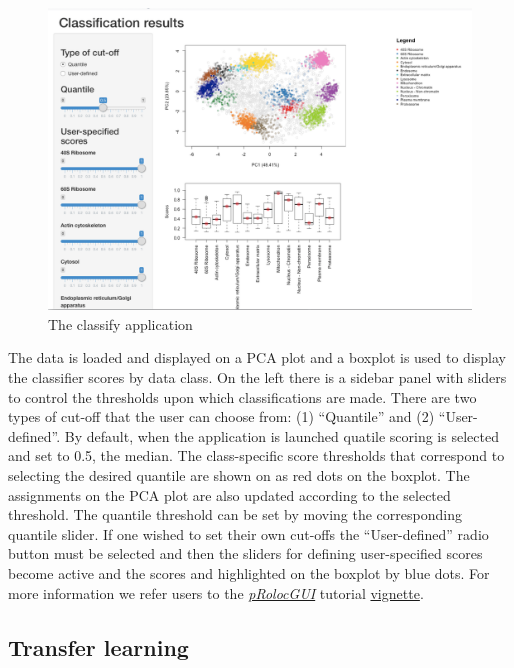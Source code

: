\begin{figure}[htbp]
\centering
\includegraphics{./Figures/classify.png}
\caption{The classify application}
\end{figure}

The data is loaded and displayed on a PCA plot and a boxplot is used to
display the classifier scores by data class. On the left there is a
sidebar panel with sliders to control the thresholds upon which
classifications are made. There are two types of cut-off that the user
can choose from: (1) ``Quantile'' and (2) ``User-defined''. By default,
when the application is launched quatile scoring is selected and set to
0.5, the median. The class-specific score thresholds that correspond to
selecting the desired quantile are shown on as red dots on the boxplot.
The assignments on the PCA plot are also updated according to the
selected threshold. The quantile threshold can be set by moving the
corresponding quantile slider. If one wished to set their own cut-offs
the ``User-defined'' radio button must be selected and then the sliders
for defining user-specified scores become active and the scores and
highlighted on the boxplot by blue dots. For more information we refer
users to the
\emph{\href{http://bioconductor.org/packages/pRolocGUI}{pRolocGUI}}
tutorial
\href{http://bioconductor.org/packages/release/bioc/vignettes/pRolocGUI/inst/doc/pRolocGUI.html}{vignette}.

\subsection{Transfer learning}\label{transfer-learning}


